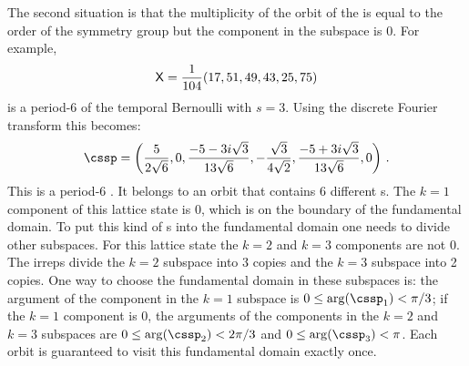 The second situation is that the multiplicity of
the orbit of the {\lattstate} is equal to the order of the symmetry group
but the component in the subspace is 0. For example,
\[
\mathsf{X} = \frac{1}{104} (17, 51, 49, 43, 25, 75)
\]
is a period-6 {\lattstate} of the temporal Bernoulli
 with $s=3$. Using the discrete Fourier transform
this {\lattstate} becomes:
\[
\cssp =
\left(\frac{5}{2 \sqrt{6}},0,\frac{-5-3 i \sqrt{3}}{13
   \sqrt{6}},-\frac{\sqrt{3}}{4\sqrt{2}},\frac{-5+3 i \sqrt{3}}{13 \sqrt{6}},0\right) \,.
\]
This is a period-6 {\lattstate}. It belongs to an orbit that
contains 6 different {\lattstate}s. The $k=1$ component of this lattice
state is 0, which is on the boundary of the fundamental domain. To put this kind of
{\lattstate}s into the fundamental domain one needs to divide other subspaces.
For this lattice state the $k=2$ and $k=3$ components are not 0. The irreps divide
the $k=2$ subspace into 3 copies and the $k=3$ subspace into 2 copies. One way to
choose the fundamental domain in these subspaces is: the argument of the component
in the $k=1$ subspace is $0\leq\arg(\cssp_{1})<\pi/3$; if the $k=1$ component
is 0, the arguments of the components
in the $k=2$ and $k=3$ subspaces are $0\leq\arg(\cssp_{2})<2\pi/3{}$ and
$0\leq\arg(\cssp_{3})<\pi$. Each orbit is guaranteed to visit this fundamental
domain exactly once.
